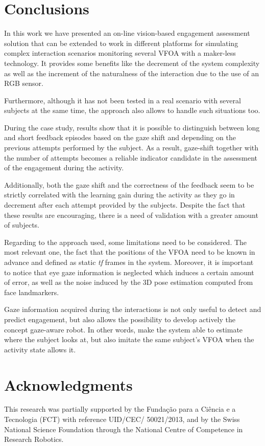 \documentclass{sig-alternate}
\begin{document}


\section{Conclusions}
In this work we have presented an on-line vision-based engagement assessment solution that can be extended to work in different platforms for simulating complex interaction scenarios monitoring several VFOA with a maker-less technology. It provides some benefits like the decrement of the system complexity as well as the increment of the naturalness of the interaction due to the use of an RGB sensor.  

Furthermore, although it has not been tested in a real scenario with several subjects at the same time, the approach also allows to handle such situations too.

During the case study, results show that it is possible to distinguish between long and short feedback episodes based on the gaze shift and depending on the previous attempts performed by the subject. As a result, gaze-shift together with the number of attempts becomes a reliable indicator candidate in the assessment of the engagement during the activity.

Additionally, both the gaze shift and the correctness of the feedback seem to be strictly correlated with the learning gain during the activity as they go in decrement after each attempt provided by the subjects. Despite the fact that these results are encouraging, there is a need of validation with a greater amount of subjects.

Regarding to the approach used, some limitations need to be considered. The most relevant one, the fact that the positions of the VFOA need to be known in advance and defined as static \textit{tf} frames in the system. Moreover, it is important to notice that eye gaze information is neglected which induces a certain amount of error, as well as the noise induced by the 3D pose estimation computed from face landmarkers.

Gaze information acquired during the interactions is not only useful to detect and predict engagement, but also allows the possibility to develop actively the concept gaze-aware robot. In other words, make the system able to estimate where the subject looks at, but also imitate the same subject's VFOA when the activity state allows it. 

\section*{Acknowledgments}
This research was partially supported by the Funda\c{c}\~{a}o para a Ci\^{e}ncia
e a Tecnologia (FCT) with reference UID/CEC/ 50021/2013, and by the Swiss
National Science Foundation through the National Centre of Competence in
Research Robotics.



\end{document}
